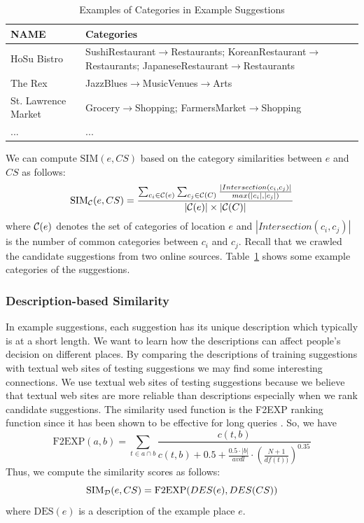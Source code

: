 \begin{table}[t]
\begin{center}
\caption{Examples of Categories in Example Suggestions}\label{tb:category_example}
\begin{tabular}{ | l | p{6.5cm} |}
\hline
\textbf{NAME} & \textbf{Categories} \\ 
\hline
\hline
HoSu Bistro & SushiRestaurant$\to$Restaurants;
             KoreanRestaurant$\to$Restaurants;
            JapaneseRestaurant$\to$Restaurants
\\ 
\hline
The Rex & JazzBlues$\to$MusicVenues$\to$Arts 
\\ 
\hline
St. Lawrence Market & Grocery$\to$Shopping;
                    FarmersMarket$\to$Shopping 
\\ 
\hline
... & ... \\
\hline
\end{tabular}
\end{center}
\end{table}
We can compute $\mathrm{SIM}(e,CS)$ based on the category similarities between 
$e$ and $CS$ as follows: 
\begin{equation}
\mathrm{SIM}_{\cal C}(e,CS) = \frac{ \sum_{c_i \in {\cal C}(e)} \sum_{c_j \in {\cal C}(C)} \frac{|Intersection(c_i,c_j)|}{max(|c_i|,|c_j|)}}{|{\cal C}(e)| \times |{\cal C}(C)|} 
\label{chap5_eq2}
\end{equation}
where
${\cal C}(e)$ denotes the set of categories of location $e$ and
$|Intersection(c_i,c_j)|$ is the number of common categories 
between $c_i$ and $c_j$. 
Recall that we crawled the candidate suggestions from two online 
sources. Table~\ref{tb:category_example} shows some example categories 
of the suggestions.

\subsubsection{Description-based Similarity}
In example suggestions, each suggestion has its unique 
description which typically is at a short length. We want 
to learn how the descriptions can affect people's decision 
on different places. By comparing the descriptions of training 
suggestions with textual web sites of testing suggestions we 
may find some interesting connections. We use textual web sites 
of testing suggestions because we believe that textual web sites 
are more reliable than descriptions especially when we rank 
candidate suggestions. The similarity used function is 
the F2EXP ranking function \cite{Fang:2005:EAA:1076034.1076116} since it has been shown to be effective 
for long queries \cite{Fang:2005:EAA:1076034.1076116}. So, we have 
\begin{equation}
\mathrm{F2EXP}(a,b)=\sum_{t\in{a\cap b}}{\frac{c(t,b)}{c(t,b)+0.5+\frac{0.5\cdot |b|}{avdl}\cdot (\frac{N+1}{df(t))})^{0.35}}}
\label{chap5_eq3}
\end{equation}
Thus, we compute the similarity scores as follows: 
\begin{equation}
\mathrm{SIM}_{\cal D}(e,CS) = \mathrm{F2EXP}(DES(e),DES(CS))
\label{chap5_eq4}
\end{equation}
where $\mathrm{DES}(e)$ is a description of the example place $e$. 


